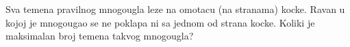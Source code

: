 \problem
Sva temena pravilnog mnogougla leze na omotacu (na stranama) kocke.
Ravan u kojoj je mnogougao se ne poklapa ni sa jednom od strana kocke.
Koliki je maksimalan broj temena takvog mnogougla?
\solution
\endproblem
